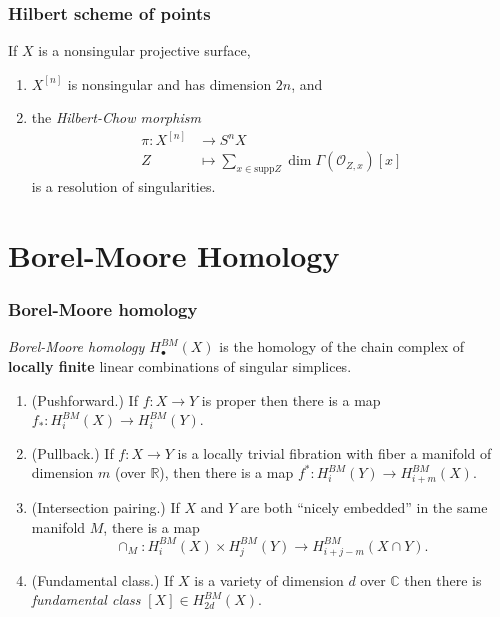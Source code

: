 \documentclass{beamer}
\begin{document}
\begin{frame}%
\frametitle{Hilbert scheme of points}
\begin{theorem}[Fogarty]
\label{theorem-fogarty}
If $X$ is a nonsingular projective surface,
\begin{enumerate}
\item $X^{[n]}$ is nonsingular and has dimension $2n$, and
\item the {\it Hilbert-Chow morphism}
\begin{align*}
\pi : X^{[n]} &\longrightarrow S^nX \\
 Z&\longmapsto \sum_{x \in \text{supp}Z}\dim\Gamma(\mathcal{O}_{Z,x})[x]
\end{align*}
is a resolution of singularities.
\end{enumerate}
\end{theorem}
\end{frame}

\section{Borel-Moore Homology}

\begin{frame}%
\frametitle{Borel-Moore homology}
{\it Borel-Moore homology $H_\bullet^{BM}(X)$}
is the homology of the chain complex
of {\bf locally finite} linear combinations
of singular simplices.

\pause
\begin{enumerate}
\item 
\label{item-pushforward}
(Pushforward.)
If $f:X \to Y$ is proper
then there is a map $f_* :H_i^{BM}(X)\to H_i^{BM}(Y)$.

\pause
\item 
\label{item-pullback}
(Pullback.) If $f:X \to Y$ 
is a locally trivial fibration with
fiber a manifold of dimension $m$ (over $\mathbb{R}$),
then there is a map
$f^* :H_i^{BM}(Y)\to H_{i+m}^{BM}(X)$.

\pause
\item  
\label{item-intersection}
(Intersection pairing.) If $X$ and $Y$ 
are both ``nicely embedded'' in the same
manifold $M$, there is a map
$$
\cap_M:H_i^{BM}(X)\times H_j^{BM}(Y)
\to H_{i+j-m}^{BM}(X\cap Y).
$$
\vspace{-1.5em}\pause
\item 
\label{item-fundamental-class}
(Fundamental class.)
If $X$ is a variety of dimension $d$ over $\mathbb{C}$ then
there is {\it fundamental class} $[X] \in H^{BM}_{2d}(X)$.
\end{enumerate}
\end{frame}
\end{document}

